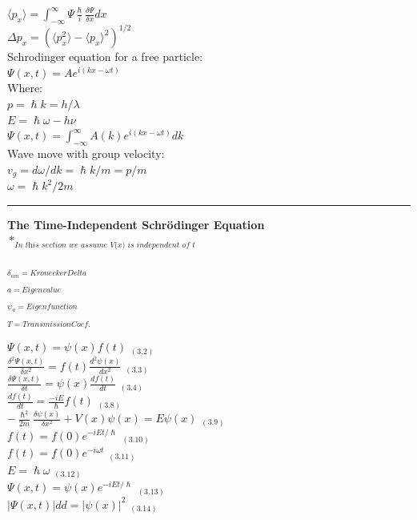 \documentclass[0pt]{report}
\begin{document}
\begin{multicols}{3}
\begin{flushleft}
$\langle p_x\rangle=\int_{-\infty}^{\infty}\Psi\frac{\hslash}{i}\frac{\delta\Psi}{\delta x}dx$\\
$\Delta p_x=(\langle p^2_x\rangle-\langle p_x\rangle^2)^{1/2}$\\
Schrodinger equation for a free particle:\\
$\Psi(x,t)=Ae^{i(kx-\omega t)}$\\
Where:\\
$p=\hslash k=h/\lambda$\\
$E=\hslash\omega-h\nu$\\
$\Psi(x,t)=\int_{-\infty}^{\infty}A(k)e^{i(kx-\omega t)}dk$\\
Wave move with group velocity:\\
$v_g=d\omega/dk=\hslash k/m=p/m$\\
$\omega=\hslash k^2/2m$\\

\noindent\rule[0.5ex]{\linewidth}{1pt}
\textbf{The Time-Independent Schrödinger Equation}\\

$*_{\textit{In this section we assume V(x) is independent of t}}$

\begin{multicols}{2}
$_{\delta_{nm}=KroneckerDelta}$\\
$_{a=Eigenvalue}$\\
$_{\psi_a=Eigenfunction}$\\
$_{T=TransmissionCoef.}$\\
\end{multicols}

$\Psi(x,t)=\psi(x)f(t)$ $_{(3.2)}$\\
$\frac{\delta^2\Psi(x,t)}{\delta x^2}=f(t)\frac{d^2\psi(x)}{dx^2}$ $_{(3.3)}$\\
$\frac{\delta\Psi(x,t)}{\delta t}=\psi(x)\frac{df(t)}{dt}$ $_{(3.4)}$\\
$\frac{df(t)}{dt}=\frac{-iE}{\hslash}f(t)$ $_{(3.8)}$\\
$-\frac{\hslash^2}{2m}\frac{\delta\psi(x)}{\delta x^2}+V(x)\psi(x)=E\psi(x)$ $_{(3.9)}$\\
$f(t)=f(0)e^{-iEt/\hslash}$ $_{(3.10)}$\\
$f(t)=f(0)e^{-i\omega t}$ $_{(3.11)}$\\
$E=\hslash\omega$ $_{(3.12)}$\\
$\Psi(x,t)=\psi(x)e^{-iEt/\hslash}$ $_{(3.13)}$\\
$|\Psi(x,t)|dd=|\psi(x)|^2$ $_{(3.14)}$\\


\end{flushleft}
\end{multicols}
\end{document}
